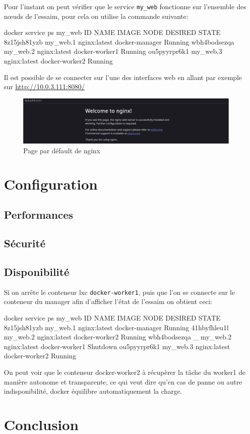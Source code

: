 \newpage

Pour l'instant on peut vérifier que le service \verb:my_web: fonctionne sur l'ensemble des
nœuds de l'essaim, pour cela on utilise la commande suivante:
\begin{bash}
docker service ps my_web
ID           NAME     IMAGE        NODE           DESIRED STATE
8z15jsh81yzb my_web.1 nginx:latest docker-manager Running      
wbh4bodsezqa my_web.2 nginx:latest docker-worker1 Running      
ou5pyyrpr6k1 my_web.3 nginx:latest docker-worker2 Running       
\end{bash}
Il est possible de se connecter sur l'une des interfaces web en allant par exemple sur 
\url{http://10.0.3.111:8080/}
\begin{figure}[h!]
    \centering
    \includegraphics[width=15cm]{img/nginx}
    \caption{Page par défault de nginx}
\end{figure}

\chapter{Configuration}

\section{Performances}

\section{Sécurité}

\section{Disponibilité}
Si on arrête le conteneur lxc \verb:docker-worker1:, puis que l'on se connecte sur le
conteneur du manager afin d'afficher l'état de l'essaim on obtient ceci:
\begin{bash}
docker service ps my_web
ID           NAME         IMAGE        NODE           DESIRED STATE   
8z15jsh81yzb my_web.1     nginx:latest docker-manager Running         
41hbyfhleu1l my_web.2     nginx:latest docker-worker2 Running        
wbh4bodsezqa  \_ my_web.2 nginx:latest docker-worker1 Shutdown      
ou5pyyrpr6k1 my_web.3     nginx:latest docker-worker2 Running      
\end{bash}
On peut voir que le conteneur docker-worker2 à récupèrer la tâche du worker1 de manière
autonome et transparente, ce qui veut dire qu'en cas de panne ou autre indisponibilité, 
docker équilibre automatiquement la charge.


\chapter{Conclusion}

